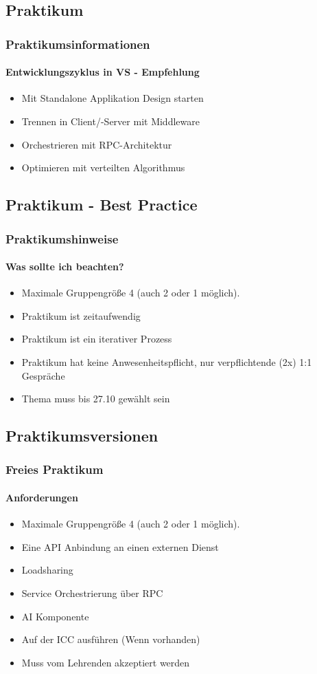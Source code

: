 \subsection{Praktikum}
\begin{frame}
  \frametitle{Praktikumsinformationen}
  \framesubtitle{Entwicklungszyklus in VS - Empfehlung}
  \begin{itemize}
    \item Mit Standalone Applikation Design starten
    \item Trennen in Client/-Server mit Middleware
    \item Orchestrieren mit RPC-Architektur 
    \item Optimieren mit verteilten Algorithmus
  \end{itemize}
\end{frame}

\subsection{Praktikum - Best Practice}
\begin{frame}
  \frametitle{Praktikumshinweise}
  \framesubtitle{Was sollte ich beachten?}
  \begin{itemize}
    \item Maximale Gruppengröße 4 (auch 2 oder 1 möglich).
    \item Praktikum ist zeitaufwendig 
    \item Praktikum ist ein iterativer Prozess 
    \item Praktikum hat keine Anwesenheitspflicht, nur verpflichtende (2x) 1:1 Gespräche
    \item Thema muss bis 27.10 gewählt sein
  \end{itemize}
\end{frame}

\subsection{Praktikumsversionen}
\begin{frame}
  \frametitle{Freies Praktikum}
  \framesubtitle{Anforderungen}
  \begin{itemize}
    \item Maximale Gruppengröße 4 (auch 2 oder 1 möglich).
    \item Eine API Anbindung an einen externen Dienst
    \item Loadsharing
    \item Service Orchestrierung über RPC
    \item AI Komponente
    \item Auf der ICC ausführen (Wenn vorhanden)
    \item Muss vom Lehrenden akzeptiert werden
  \end{itemize}
\end{frame}

